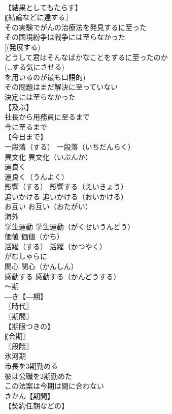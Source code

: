 \documentclass[8pt]{extreport}
\begin{document}
\begin{CJK}{UTF8}{min}
\\	【結果としてもたらす】
\\	〖結論などに達する〗
\\	その実験でがんの治療法を発見するに至った
\\	その国境紛争は戦争には至らなかった
\\	[(発展する) 
\\	どうして君はそんなばかなことをするに至ったのか
\\	(…する気にさせる) 
\\	を用いるのが最も口語的)
\\	その問題はまだ解決に至っていない
\\	決定には至らなかった
\\	【及ぶ】
\\	社長から用務員に至るまで
\\	今に至るまで
\\	【今日まで】
\\	一段落（する）		一段落（いちだんらく）
\\	異文化		異文化（いぶんか）
\\	運良く		
\\	運良く（うんよく）
\\	影響（する）		影響する（えいきょう）
\\	追いかける		追いかける（おいかける）
\\	お互い		お互い（おたがい）
\\	海外		
\\	学生運動		学生運動（がくせいうんどう）
\\	価値		価値（かち）
\\	活躍（する）		活躍（かつやく）
\\	がむしゃらに		
\\	関心		関心（かんしん）
\\	感動する		感動する（かんどうする）
\\	〜期		
\\	―き【―期】
\\	〖時代〗
\\	〖期間〗
\\	【期限つきの】
\\	〖会期〗
\\	〖段階〗
\\	氷河期
\\	市長を3期勤める
\\	彼は公職を2期勤めた
\\	この法案は今期は間に合わない
\\	きかん【期間】
\\	【契約任期などの】

\end{CJK}
\end{document}
